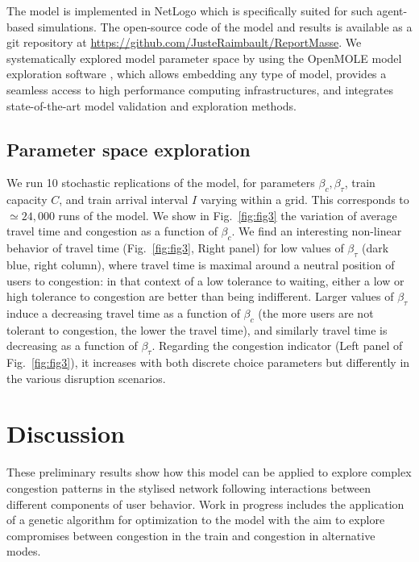 \documentclass[3p,times,procedia]{elsarticle}
\begin{document}
The model is implemented in NetLogo which is specifically suited for such agent-based simulations. The open-source code of the model and results is available as a git repository at \url{https://github.com/JusteRaimbault/ReportMasse}. We systematically explored model parameter space by using the OpenMOLE model exploration software \citep{reuillon2013openmole}, which allows embedding any type of model, provides a seamless access to high performance computing infrastructures, and integrates state-of-the-art model validation and exploration methods.

\subsection{Parameter space exploration}

We run 10 stochastic replications of the model, for parameters $\beta_c,\beta_{\tau}$, train capacity $C$, and train arrival interval $I$ varying within a grid. This corresponds to $\simeq 24,000$ runs of the model. We show in Fig.~\ref{fig:fig3} the variation of average travel time and congestion as a function of $\beta_c$. We find an interesting non-linear behavior of travel time (Fig.~\ref{fig:fig3}, Right panel) for low values of $\beta_{\tau}$ (dark blue, right column), where travel time is maximal around a neutral position of users to congestion: in that context of a low tolerance to waiting, either a low or high tolerance to congestion are better than being indifferent. Larger values of $\beta_{\tau}$ induce a decreasing travel time as a function of $\beta_c$ (the more users are not tolerant to congestion, the lower the travel time), and similarly travel time is decreasing as a function of $\beta_{\tau}$. Regarding the congestion indicator (Left panel of Fig.~\ref{fig:fig3}), it increases with both discrete choice parameters but differently in the various disruption scenarios.


\section{Discussion}


These preliminary results show how this model can be applied to explore complex congestion patterns in the stylised network following interactions between different components of user behavior. Work in progress includes the application of a genetic algorithm for optimization to the model with the aim to explore compromises between congestion in the train and congestion in alternative modes.






%





\clearpage
\end{document}
